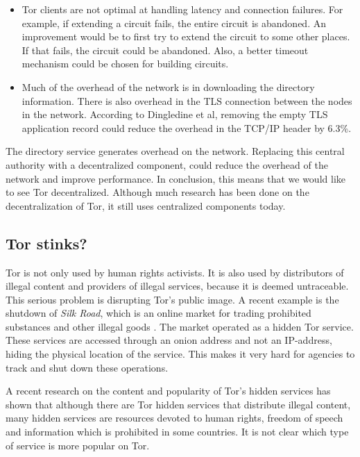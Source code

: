 \documentclass{article}
\begin{document}
\begin{itemize}
			\item Tor clients are not optimal at handling latency and connection failures. For example, if extending a circuit fails, the entire circuit is abandoned. An improvement would be to first try to extend the circuit to some other places. If that fails, the circuit could be abandoned. Also, a better timeout mechanism could be chosen for building circuits.
			
			\item Much of the overhead of the network is in downloading the directory information. There is also overhead in the TLS connection between the nodes in the network. According to Dingledine et al, removing the empty TLS application record could reduce the overhead in the TCP/IP header by 6.3\%.	
		\end{itemize}
		
		The directory service generates overhead on the network. Replacing this central authority with a decentralized component, could reduce the overhead of the network and improve performance. In conclusion, this means that we would like to see Tor decentralized. Although much research has been done on the decentralization of Tor, it still uses centralized components today.

		\subsection{Tor stinks?}
			Tor is not only used by human rights activists. It is also used by distributors of illegal content and providers of illegal services, because it is deemed untraceable. This serious problem is disrupting Tor's public image. A recent example is the shutdown of \emph{Silk Road}, which is an online market for trading prohibited substances and other illegal goods \cite{ibtimes2013}. The market operated as a hidden Tor service. These services are accessed through an onion address and not an IP-address, hiding the physical location of the service. This makes it very hard for agencies to track and shut down these operations.

			A recent research on the content and popularity of Tor's hidden services \cite{biryukov2013content} has shown that although there are Tor hidden services that distribute illegal content, many hidden services are resources devoted to human rights, freedom of speech and information which is prohibited in some countries. It is not clear which type of service is more popular on Tor.
\end{document}
